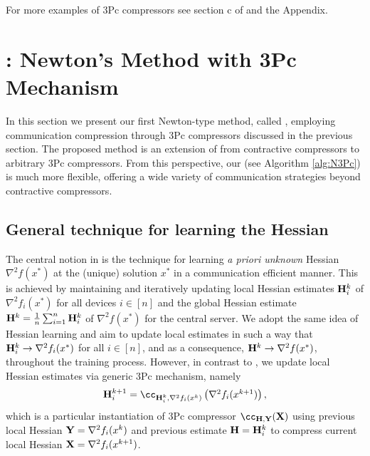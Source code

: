 \documentclass[11pt]{article}
\begin{document}
	For more examples of 3Pc compressors see section c of \citep{richtarik3Pc} and the Appendix.
	
	
	
	\section{: Newton's Method with 3Pc Mechanism}\label{sec:N3Pc}
	
	In this section we present our first Newton-type method, called , employing communication compression through 3Pc compressors discussed in the previous section. The proposed method is an extension of  \citep{FedNL2021} from contractive compressors to arbitrary 3Pc compressors. From this perspective, our  (see Algorithm \ref{alg:N3Pc}) is much more flexible, offering a wide variety of communication strategies beyond contractive compressors.
	
	
	\subsection{General technique for learning the Hessian}
	The central notion in  is the technique for learning {\em a priori unknown} Hessian $\nabla^2 f(x^*)$ at the (unique) solution $x^*$ in a communication efficient manner. This is achieved by maintaining and iteratively updating local Hessian estimates $\mathbf{H}_i^k$ of $\nabla^2 f_i(x^*)$ for all devices $i\in[n]$ and the global Hessian estimate $\mathbf{H}^k = \frac{1}{n}\sum_{i=1}^n \mathbf{H}_i^k$ of $\nabla^2 f(x^*)$ for the central server.
	We adopt the same idea of Hessian learning and aim to update local estimates in such a way that $\mathbf{H}_i^k\to\nabla^2 f_i(x^*)$ for all $i\in[n]$, and as a consequence, $\mathbf{H}^k\to\nabla^2 f(x^*)$, throughout the training process. However, in contrast to , we update local Hessian estimates via generic 3Pc mechanism, namely $$\textstyle\mH_i^{k+1} = \cc_{\mH_i^k,\nabla^2f_i(x^k)}\left(\nabla^2f_i(x^{k+1})\right),$$
	which is a particular instantiation of 3Pc compressor $\cc_{\mH,\mY}(\mX)$ using previous local Hessian $\mathbf{Y} = \nabla^2 f_i(x^k)$ and previous estimate $\mathbf{H} = \mathbf{H}_i^k$ to compress current local Hessian $\mathbf{X} = \nabla^2 f_i(x^{k+1})$.
	
\end{document}
